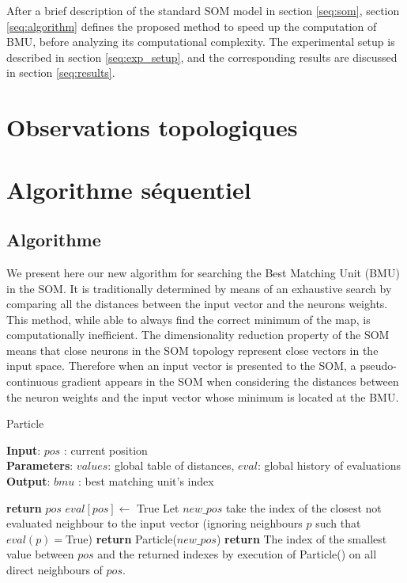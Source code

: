 	After a brief description of the standard SOM model in section \ref{seq:som}, section \ref{seq:algorithm} defines the proposed method to speed up the computation of BMU, before analyzing its computational complexity. The experimental setup is described in section \ref{seq:exp_setup}, 
	and the corresponding results are discussed in section \ref{seq:results}.


	\section{Observations topologiques}
	\newpage
	\section{Algorithme séquentiel}
	\subsection{Algorithme}

	We present here our new algorithm for searching the Best Matching Unit (BMU) in the SOM. It is traditionally determined by means of an exhaustive search by comparing all the distances between the input vector and the neurons weights. This method, while able to always find the correct minimum of the map, is computationally inefficient. The dimensionality reduction property of the SOM means that close neurons in the SOM topology represent close vectors in the input space. Therefore when an input vector is presented to the SOM, a pseudo-continuous gradient appears in the SOM when considering the distances between the neuron weights and the input vector whose minimum is located at the BMU. 

	\begin{algorithm}[tb]
	\caption{Particle}
	\label{alg:particle}
	\textbf{Input}: $pos$ : current position\\
	\textbf{Parameters}: $values$: global table of distances, $eval$: global history of evaluations \\
	\textbf{Output}: $bmu$ : best matching unit's index
	\begin{algorithmic}[1] %
	\STATE \textbf{return} $pos$
	\ENDIF
	\STATE $eval[pos] \xleftarrow{}$ True
	\STATE Let $new\_pos$ take the index of the closest not evaluated neighbour to the input vector (ignoring neighbours $p$ such that $eval(p)=$True)
	\STATE \textbf{return} Particle($new\_pos$)
	\ENDIF
	\STATE \textbf{return} The index of the smallest value between $pos$ and the returned indexes by execution of Particle() on all direct neighbours of $pos$.
	\end{algorithmic}
	\end{algorithm}

